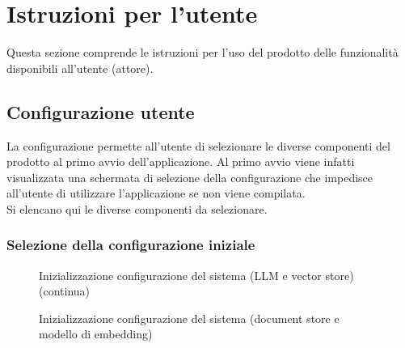 \documentclass[10pt, a4paper]{article}
\begin{document}
\newpage


\section{Istruzioni per l'utente}
Questa sezione comprende le istruzioni per l'uso del prodotto delle funzionalità disponibili all'utente (attore).
\subsection{Configurazione utente}
La configurazione permette all'utente di selezionare le diverse componenti del prodotto al primo avvio dell'applicazione. Al primo avvio viene infatti visualizzata una schermata di selezione della configurazione che impedisce all'utente di utilizzare l'applicazione se non viene compilata.\\ Si elencano qui le diverse componenti da selezionare.
\subsubsection{Selezione della configurazione iniziale}
\begin{figure}[H]
    \centering   
    \caption{Inizializzazione configurazione del sistema (LLM e vector store) (continua)}
    \label{img:configuration1}
\end{figure}
\begin{figure}[H]
    \centering  
    \caption{Inizializzazione configurazione del sistema (document store e modello di embedding)}
    \label{img:configuration2}
\end{figure}
\end{document}
